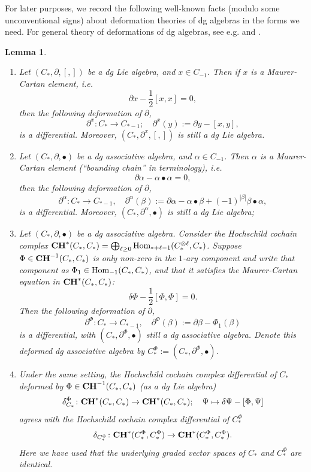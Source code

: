 \documentclass[10pt]{amsart}
\numberwithin{equation}{section}
\theoremstyle{plain}
\newtheorem{lemma}[theorem]{Lemma}
\theoremstyle{definition}
\theoremstyle{remark}
\numberwithin{equation}{section}
\newcommand{\Hom}{\textup{Hom}}
\newcommand{\CC}{\textbf{\textup{CH}}}
\begin{document}
{For later purposes, we record the following well-known facts (modulo some unconventional signs) about deformation theories of dg algebras in the forms we need. For general theory of deformations of dg algebras, see e.g. \cite{FukayaDefo} and \cite{FOOO1}.
\begin{lemma}\label{Lm: dgDefo}
	\begin{enumerate}
		\item Let $(C_*,\partial,[,])$ be a dg Lie algebra, and $x\in C_{-1}$. Then if $x$ is a Maurer-Cartan element, i.e. \[ \partial x - \frac{1}{2}[x,x] = 0, \]then the following deformation of $\partial$,\[ \partial^x\colon C_*\to C_{*-1};\quad \partial^x(y):= \partial y - [x,y],\]is a differential. Moreover, $(C_*,\partial^x,[,])$ is still a dg Lie algebra.
		\item Let $(C_*, \partial, \bullet)$ be a dg associative algebra, and $\alpha \in C_{-1}$. Then $\alpha$ is a Maurer-Cartan element (``bounding chain'' in \cite{FOOO1} terminology), i.e. \[ \partial \alpha - \alpha \bullet \alpha = 0, \]
		then the following deformation of $\partial$,
		\[
			\partial^\alpha\colon C_*\to C_{*-1},\quad \partial^\alpha(\beta):= \partial \alpha - \alpha \bullet \beta + (-1)^{|\beta|} \beta \bullet \alpha,
		\]
		is a differential. Moreover, $(C_*, \partial^\alpha, \bullet)$ is still a dg Lie algebra;
		\item Let $(C_*, \partial,\bullet)$ be a dg associative algebra. Consider the Hochschild cochain complex $\CC^*(C_*,C_*) = \bigoplus_{\ell\geq 0} \Hom_{*+\ell-1}(C_*^{\otimes \ell}, C_*)$. Suppose $\Phi\in \CC^{-1}(C_*,C_*)$ is only non-zero in the $1$-ary component and write that component as $\Phi_1\in \Hom_{-1}(C_*,C_*)$, and that it satisfies the Maurer-Cartan equation in $\CC^*(C_*,C_*)$: \[ \delta \Phi - \frac{1}{2}[\Phi,\Phi]=0. \]Then the following deformation of $\partial$, 
		\[ \partial^\Phi\colon C_*\to C_{*-1}, \quad \partial^\Phi(\beta):=  \partial \beta -\Phi_1(\beta)  \]is a differential, with $(C_*, \partial^\Phi, \bullet)$ still a dg associative algebra. Denote this deformed dg associative algebra by $C_*^\Phi:= (C_*,\partial^\Phi,\bullet)$.
		\item Under the same setting, the Hochschild cochain complex differential of $C_*$ deformed by $\Phi\in \CC^{-1}(C_*,C_*)$ (as a dg Lie algebra) \[ \delta_{C_*}^\Phi\colon \CC^*(C_*,C_*)\to \CC^*(C_*,C_*); \quad \Psi \mapsto  \delta\Psi - [\Phi,\Psi]  \]agrees with the Hochschild cochain complex differential of $C_*^\Phi$ \[ \delta_{C_*^\Phi}\colon \CC^*(C_*^\Phi,C_*^\Phi)\to \CC^*(C_*^\Phi,C_*^\Phi). \]Here we have used that the underlying graded vector spaces of $C_*$ and $C_*^\Phi$ are identical.
	\end{enumerate}
\end{lemma}






}
\end{document}

